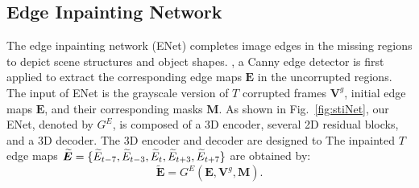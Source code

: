\subsection{Edge Inpainting Network}
\label{sec:edgenet}
 
The edge inpainting network (ENet) completes image edges in the missing regions to depict scene structures and object shapes.
, a Canny edge detector is first applied to extract the corresponding edge maps $\boldsymbol{E}$ in the uncorrupted regions. %
The input of ENet is  the grayscale version of $T$ corrupted frames $\boldsymbol{V}^{g}$, initial edge maps $\boldsymbol{E}$, and their corresponding masks $\boldsymbol{M}$.
%
As shown in Fig.~\ref{fig:stiNet}, our ENet, denoted by $G^E$, is composed of a 3D encoder, several 2D residual blocks, and a 3D decoder. 
The 3D encoder and decoder are designed to 
The inpainted $T$ edge maps 	$\boldsymbol{\widetilde{E}}=\{\widetilde{E}_{t-7},\widetilde{E}_{t-3},\widetilde{E}_{t},\widetilde{E}_{t+3},\widetilde{E}_{t+7}\}$ are obtained by:
\begin{equation}
	\label{eq:edgenet}
	\boldsymbol{\widetilde{E}}=G^E(\boldsymbol{E},\boldsymbol{V}^{g},\boldsymbol{M}).
\end{equation}

